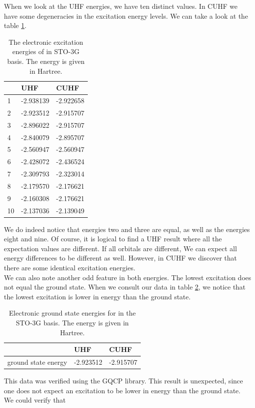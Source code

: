 \documentclass[twoside,twocolumn,9pt]{article}
\begin{document}
When we look at the UHF energies, we have ten distinct values. In CUHF we have some degeneracies in the excitation energy levels. 
We can take a look at the table \ref{tab:excits}.

\begin{table}[h]
  \caption{The electronic excitation energies of  in STO-3G basis. The energy is given in Hartree.}
  \label{tab:excits}
  \begin{tabular}{l|l|l}
       & UHF       & CUHF      \\
    \hline
    1  & -2.938139 & -2.922658 \\
    2  & -2.923512 & -2.915707 \\
    3  & -2.896022 & -2.915707 \\
    4  & -2.840079 & -2.895707 \\
    5  & -2.560947 & -2.560947 \\
    6  & -2.428072 & -2.436524 \\
    7  & -2.309793 & -2.323014 \\
    8  & -2.179570 & -2.176621 \\
    9  & -2.160308 & -2.176621 \\
    10 & -2.137036 & -2.139049
  \end{tabular}
\end{table}
We do indeed notice that energies two and three are equal, as well as the energies eight and nine. Of course, it is logical to find a UHF result where all the expectation values are
different. If all orbitals are different, We can expect all energy differences to be different as well. However, in CUHF we discover that there are some identical
excitation energies. \\
We can also note another odd feature in both energies. The lowest excitation does not equal the ground state. When we consult our data in table
\ref{tab:ground states}, we notice that the lowest excitation is lower in energy than the ground state.
\begin{table}[h]
  \caption{Electronic ground state energies for  in the STO-3G basis. The energy is given in Hartree.}
  \label{tab:ground states}
  \begin{tabular}{l|l|l}
                        & UHF       & CUHF      \\
    \hline
    ground state energy & -2.923512 & -2.915707
  \end{tabular}
\end{table}
This data was verified using the GQCP library. This result is unexpected, since one does not expect an excitation to be lower in energy than the ground state. We could verify that
\end{document}
